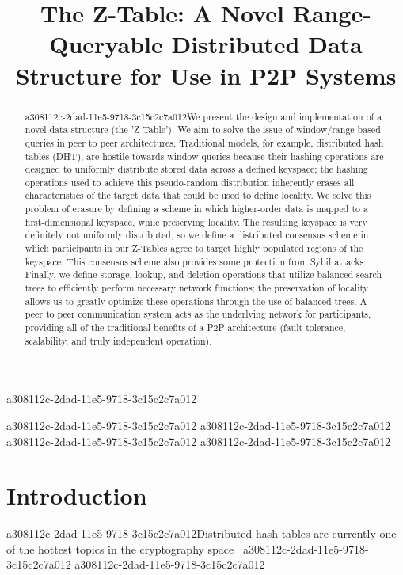 \documentclass[12pt]{article}
\title{The Z-Table: A Novel Range-Queryable Distributed Data Structure for Use in P2P Systems}
\begin{document}
a308112c-2dad-11e5-9718-3c15c2c7a012\maketitle

\begin{abstract}
a308112c-2dad-11e5-9718-3c15c2c7a012We present the design and implementation of a novel data structure (the 'Z-Table'). We aim to solve the issue of window/range-based queries in peer to peer architectures. Traditional models, for example,  distributed hash tables (DHT), are hostile towards window queries because their hashing operations are designed to uniformly distribute stored data across a defined keyspace; the hashing operations used to achieve this pseudo-random distribution inherently erases all characteristics of the target data that could be used to define locality. We solve this problem of erasure by defining a scheme in which higher-order data is mapped to a first-dimensional keyspace, while preserving locality. The resulting keyspace is very definitely not uniformly distributed, so we define a distributed consensus scheme in which participants in our Z-Tables agree to target highly populated regions of the keyspace. This consensus scheme also provides some protection from Sybil attacks. Finally, we define storage, lookup, and deletion operations that utilize balanced search trees to efficiently perform necessary network functions; the preservation of locality allows us to greatly optimize these operations through the use of balanced trees. A peer to peer communication system acts as the underlying network for participants, providing all of the traditional benefits of a P2P architecture (fault tolerance, scalability, and truly independent operation).
\end{abstract}
a308112c-2dad-11e5-9718-3c15c2c7a012
a308112c-2dad-11e5-9718-3c15c2c7a012
a308112c-2dad-11e5-9718-3c15c2c7a012\newpage
a308112c-2dad-11e5-9718-3c15c2c7a012\section{Introduction}
a308112c-2dad-11e5-9718-3c15c2c7a012Distributed hash tables are currently one of the hottest topics in the cryptography space~\cite{Stoica:2001dj,Rowstron:2001ea,Ratnasamy:2001wn}
a308112c-2dad-11e5-9718-3c15c2c7a012
a308112c-2dad-11e5-9718-3c15c2c7a012\printbibliography
\end{document}
